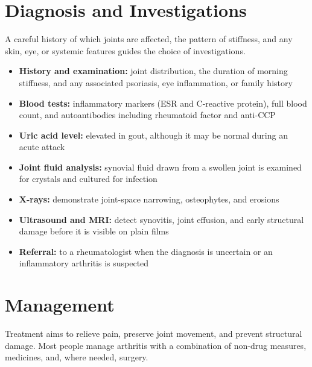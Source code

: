 \section*{Diagnosis and Investigations}
A careful history of which joints are affected, the pattern of stiffness, and any skin, eye, or systemic features guides the choice of investigations.

\begin{itemize}
    \item \textbf{History and examination:} joint distribution, the duration of morning stiffness, and any associated psoriasis, eye inflammation, or family history
    \item \textbf{Blood tests:} inflammatory markers (ESR and C-reactive protein), full blood count, and autoantibodies including rheumatoid factor and anti-CCP
    \item \textbf{Uric acid level:} elevated in gout, although it may be normal during an acute attack
    \item \textbf{Joint fluid analysis:} synovial fluid drawn from a swollen joint is examined for crystals and cultured for infection
    \item \textbf{X-rays:} demonstrate joint-space narrowing, osteophytes, and erosions
    \item \textbf{Ultrasound and MRI:} detect synovitis, joint effusion, and early structural damage before it is visible on plain films
    \item \textbf{Referral:} to a rheumatologist when the diagnosis is uncertain or an inflammatory arthritis is suspected
\end{itemize}

\section*{Management}
Treatment aims to relieve pain, preserve joint movement, and prevent structural damage. Most people manage arthritis with a combination of non-drug measures, medicines, and, where needed, surgery.

